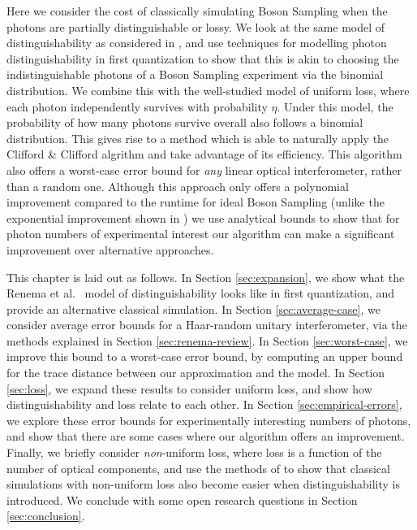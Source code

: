 Here we consider the cost of classically simulating Boson Sampling when the photons are partially distinguishable or lossy.
We look at the same model of distinguishability as considered in \cite{renema2018,renema2018loss}, and use techniques for modelling photon distinguishability in first quantization \cite{moylett2018, stanisic2018} to show that this is akin to choosing the indistinguishable photons of a Boson Sampling experiment via the binomial distribution. 
We combine this with the well-studied model of uniform loss, where each photon independently survives with probability $\eta$. Under this model, the probability of how many photons survive overall also follows a binomial distribution. 
This gives rise to a method which is able to naturally apply the Clifford \& Clifford algrithm and take advantage of its efficiency. This algorithm also offers a worst-case error bound for \textit{any} linear optical interferometer, rather than a random one.
Although this approach only offers a polynomial improvement compared to the runtime for ideal Boson Sampling (unlike the exponential improvement shown in \cite{renema2018,renema2018loss}) we use analytical bounds to show that for photon numbers of experimental interest our algorithm can make a significant improvement over alternative approaches. 

This chapter is laid out as follows.
In Section \ref{sec:expansion}, we show what the Renema et al.~\cite{renema2018, renema2018loss} model of distinguishability looks like in first quantization, and provide an alternative classical simulation. 
In Section \ref{sec:average-case}, we consider average error bounds for a Haar-random unitary interferometer, via the methods explained in Section \ref{sec:renema-review}. 
In Section \ref{sec:worst-case}, we improve this bound to a worst-case error bound, by computing an upper bound for the trace distance between our approximation and the model. 
In Section \ref{sec:loss}, we expand these results to consider uniform loss, and show how distinguishability and loss relate to each other. 
In Section \ref{sec:empirical-errors}, we explore these error bounds for experimentally interesting numbers of photons, and show that there are some cases where our algorithm offers an improvement. 
Finally, we briefly consider \emph{non}-uniform loss, where loss is a function of the number of optical components, and use the methods of \cite{garciapatron2017, oszmaniec2018} to show that classical simulations with non-uniform loss also become easier when distinguishability is introduced.
We conclude with some open research questions in Section \ref{sec:conclusion}.


